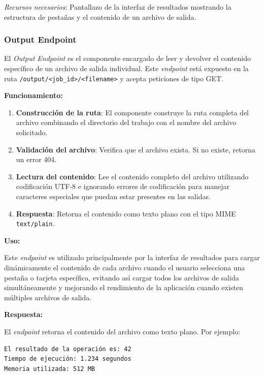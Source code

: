 \textit{Recursos necesarios}: Pantallazo de la interfaz de resultados mostrando la estructura de pestañas y el contenido de un archivo de salida.

\subsubsection{Output Endpoint}
\noindent

El \textit{Output Endpoint} es el componente encargado de leer y devolver el contenido específico de un archivo de salida individual. Este \textit{endpoint} está expuesto en la ruta \texttt{/output/<job\_id>/<filename>} y acepta peticiones de tipo GET.

\textbf{Funcionamiento:}

\begin{enumerate}
	\item \textbf{Construcción de la ruta}: El componente construye la ruta completa del archivo combinando el directorio del trabajo con el nombre del archivo solicitado.

	\item \textbf{Validación del archivo}: Verifica que el archivo exista. Si no existe, retorna un error 404.

	\item \textbf{Lectura del contenido}: Lee el contenido completo del archivo utilizando codificación UTF-8 e ignorando errores de codificación para manejar caracteres especiales que puedan estar presentes en las salidas.

	\item \textbf{Respuesta}: Retorna el contenido como texto plano con el tipo MIME \texttt{text/plain}.
\end{enumerate}

\textbf{Uso:}

Este \textit{endpoint} es utilizado principalmente por la interfaz de resultados para cargar dinámicamente el contenido de cada archivo cuando el usuario selecciona una pestaña o tarjeta específica, evitando así cargar todos los archivos de salida simultáneamente y mejorando el rendimiento de la aplicación cuando existen múltiples archivos de salida.

\textbf{Respuesta:}

El \textit{endpoint} retorna el contenido del archivo como texto plano. Por ejemplo:

\begin{verbatim}
El resultado de la operación es: 42
Tiempo de ejecución: 1.234 segundos
Memoria utilizada: 512 MB
\end{verbatim}

